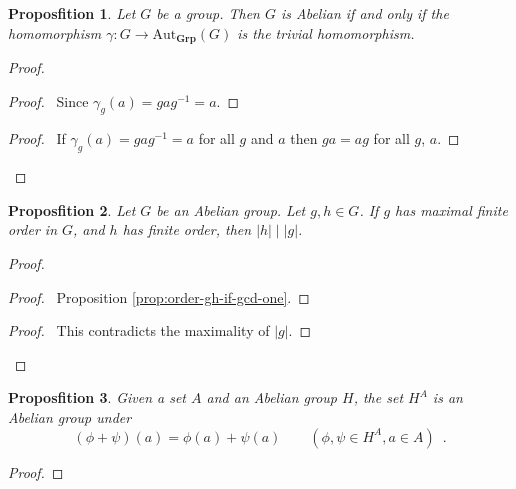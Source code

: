 \documentclass{book}
\let\qed\relax
\newtheorem{prop}{Proposfition}[chapter]
\theoremstyle{definition}
\newcommand{\Aut}[2]{\ensuremath{\mathrm{Aut}_{#1} \left( {#2} \right)}}
\newcommand{\Grp}{\ensuremath{\mathbf{Grp}}}
\newcommand{\inv}[1]{\ensuremath{{#1}^{-1}}}
\begin{document}
\begin{prop}
    Let $G$ be a group. Then $G$ is Abelian if and only if the homomorphism $\gamma : G \rightarrow \Aut{\Grp}{G}$ is the trivial homomorphism.
\end{prop}

\begin{proof}
    \pf
    \begin{proof}
        \pf\ Since $\gamma_g(a) = ga\inv{g} = a$.
    \end{proof}
    \begin{proof}
        \pf\ If $\gamma_g(a) = ga\inv{g} = a$ for all $g$ and $a$ then $ga = ag$ for all $g$, $a$.
    \end{proof}
    \qed
\end{proof}

\begin{prop}
    \label{prop:maximal-finite-order}
    Let $G$ be an Abelian group. Let $g,h \in G$. If $g$ has maximal finite order in $G$, and $h$ has finite order, then $|h| \mid |g|$.
\end{prop}

\begin{proof}
    \pf
    \begin{proof}
        \pf\ Proposition \ref{prop:order-gh-if-gcd-one}.
    \end{proof}
    \qedstep
    \begin{proof}
        \pf\ This contradicts the maximality of $|g|$.
    \end{proof}
    \qed
\end{proof}

\begin{prop}
    Given a set $A$ and an Abelian group $H$, the set $H^A$ is an Abelian group under
    \[ (\phi + \psi)(a) = \phi(a) + \psi(a) \qquad (\phi,\psi \in H^A, a \in A) \enspace . \]
\end{prop}

\begin{proof}
    \pf
    \qed
\end{proof}
\end{document}
